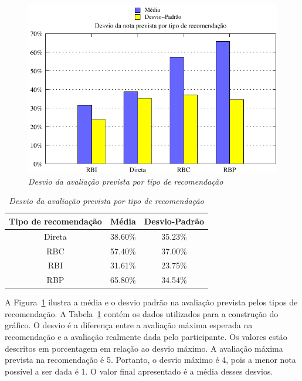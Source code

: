 \begin{figure}
    \centering
    \includegraphics[width=\textwidth]{imagens/grafico_erro}
    \caption{\it Desvio da avaliação prevista por tipo de recomendação}
    \label{fig:erro}
\end{figure}

\begin{table}
\centering
\begin{tabular}{c c c}
    \hline \hline
    \textbf{Tipo de recomendação} & \textbf{Média}	& \textbf{Desvio-Padrão} \\
\hline 
Direta & 38.60\% & 35.23\% \\
\hline 
RBC & 57.40\% & 37.00\% \\
\hline 
RBI & 31.61\% & 23.75\% \\
\hline 
RBP & 65.80\% & 34.54\% \\
\hline        
\end{tabular}
\caption{\it Desvio da avaliação prevista por tipo de recomendação}
\label{table:erro}
\end{table}


A Figura~\ref{fig:erro} ilustra a média e o desvio padrão na avaliação prevista pelos tipos de recomendação. A Tabela~\ref{table:erro} contém os dados utilizados para a construção do gráfico. O desvio é a diferença entre a avaliação máxima esperada na recomendação e a avaliação realmente dada pelo participante. Os valores estão descritos em porcentagem em relação ao desvio máximo. A avaliação máxima prevista na recomendação é 5. Portanto, o desvio máximo é 4, pois a menor nota possível a ser dada é 1. O valor final apresentado é a média desses desvios.

